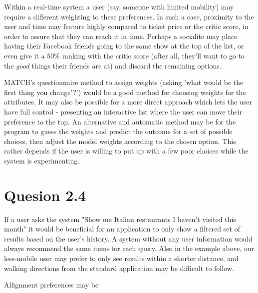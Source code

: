\documentclass[a4paper,11pt,oneside]{article}
\begin{document}
Within a real-time system a user (say, someone with limited mobility) may require a different weighting to these preferences. In such a case, proximity to the user and time may feature highly compared to ticket price or the critic score, in order to assure that they can reach it in time. Perhaps a socialite may place having their Facebook friends going to the same show at the top of the list, or even give it a 50\% ranking with the critic score (after all, they'll want to go to the \emph{good} things their friends are at) and discard the remaining options.

MATCH's questionnaire method to assign weights (asking 'what would be the first thing you change'?') would be a good method for choosing weights for the attributes. It may also be possible for a more direct approach which lets the user have full control - presenting an interactive list where the user can move their preference to the top. An alternative and automatic method may be for the program to guess the weights and predict the outcome for a set of possible choices, then adjust the model weights according to the chosen option. This rather depends if the user is willing to put up with a few poor choices while the system is experimenting.

\section{Quesion 2.4}
If a user asks the system "Show me Italian restaurants I haven't visited this month" it would be beneficial for an application to only show a filtered set of results based on the user's history. A system without any user information would always recommend the same items for each query. Also in the example above, our less-mobile user may prefer to only see results within a shorter distance, and walking directions from the standard application may be difficult to follow.

Allignment preferences may be 
\end{document}
